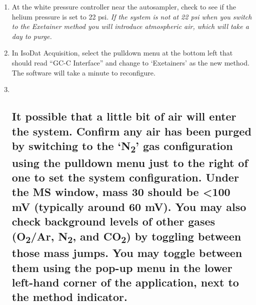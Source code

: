\documentclass[]{article}
\begin{document}
\begin{enumerate}
\def\labelenumi{\arabic{enumi}.}
\item
  At the white pressure controller near the autosampler, check to see if
  the helium pressure is set to 22 psi. \emph{If the system is not at 22
  psi when you switch to the Exetainer method you will introduce
  atmospheric air, which will take a day to purge.}\\
\item
  In IsoDat Acquisition, select the pulldown menu at the bottom left
  that should read ``GC-C Interface'' and change to `Exetainers' as the
  new method. The software will take a minute to reconfigure.\\
\item ~
  \subsection{\texorpdfstring{It possible that a little bit of air will
  enter the system. Confirm any air has been purged by switching to the
  `N\textsubscript{2}' gas configuration using the pulldown menu just to
  the right of one to set the system configuration. Under the MS window,
  mass 30 should be \textless{}100 mV (typically around 60 mV). You may
  also check background levels of other gases (O\textsubscript{2}/Ar,
  N\textsubscript{2}, and CO\textsubscript{2}) by toggling between those
  mass jumps. You may toggle between them using the pop-up menu in the
  lower left-hand corner of the application, next to the method
  indicator.}{It possible that a little bit of air will enter the system. Confirm any air has been purged by switching to the N2 gas configuration using the pulldown menu just to the right of one to set the system configuration. Under the MS window, mass 30 should be \textless{}100 mV (typically around 60 mV). You may also check background levels of other gases (O2/Ar, N2, and CO2) by toggling between those mass jumps. You may toggle between them using the pop-up menu in the lower left-hand corner of the application, next to the method indicator.}}\label{it-possible-that-a-little-bit-of-air-will-enter-the-system.-confirm-any-air-has-been-purged-by-switching-to-the-n2-gas-configuration-using-the-pulldown-menu-just-to-the-right-of-one-to-set-the-system-configuration.-under-the-ms-window-mass-30-should-be-100-mv-typically-around-60-mv.-you-may-also-check-background-levels-of-other-gases-o2ar-n2-and-co2-by-toggling-between-those-mass-jumps.-you-may-toggle-between-them-using-the-pop-up-menu-in-the-lower-left-hand-corner-of-the-application-next-to-the-method-indicator.}


\end{enumerate}
\end{document}
